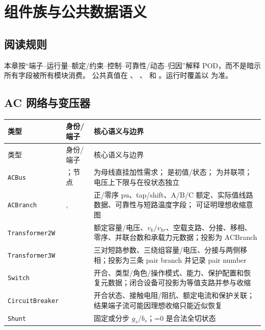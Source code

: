\section{组件族与公共数据语义}

\subsection{阅读规则}

本章按“端子--运行量--额定/约束--控制--可靠性/动态--归因”解释 POD，而不是暗示所有字段被所有模块消费。
公共真值在 、
、 和
。运行时覆盖以  为准。

\subsection{AC 网络与变压器}

\begin{center}\footnotesize
\begin{longtable}{@{}L{3.2cm}L{4.7cm}L{7.3cm}@{}}
\toprule 类型 & 身份/端子 & 核心语义与边界\\\midrule
\endfirsthead
\toprule 类型 & 身份/端子 & 核心语义与边界\\\midrule\endhead
\texttt{ACBus} & ；节点 &  为母线直挂加性需求； 是初值/状态； 为并联项；电压上下限与在役状态独立\\
\texttt{ACBranch} & ,  & 正/零序 pu、tap/shift、A/B/C 额定、实际值线路数据、可靠性与短路温度字段； 可证明理想收缩意图\\
\texttt{Transformer2W} &  & 额定容量/电压、$v_k/v_{kr}$、空载支路、分接、移相、零序、并联台数和承载力元数据；投影为 ACBranch\\
\texttt{Transformer3W} &  & 三对短路参数、三绕组容量/电压、分接与两侧移相；投影为三条 pair branch 并记录 pair number\\
\texttt{Switch} &  & 开合、类型/角色/操作模式、能力、保护配置和恢复元数据；闭合设备可投影为等值支路并参与收缩\\
\texttt{CircuitBreaker} &  & 开合状态、接触电阻/阻抗、额定电流和保护关联；结果端子流可能因理想收缩只能近似恢复\\
\texttt{Shunt} &  & 固定或分步 $g_s/b_s$；=0 是合法全切状态\\
\bottomrule
\end{longtable}
\end{center}

